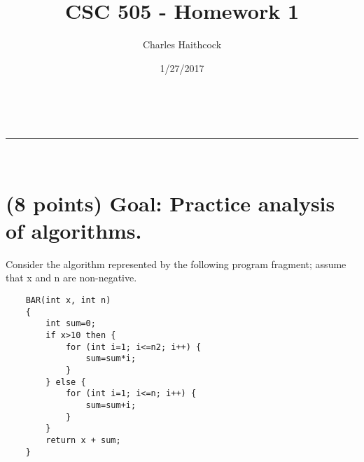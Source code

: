 \documentclass[a4paper,11pt]{article}
\makeatletter
\newcommand{\linia}{\rule{\linewidth}{0.5pt}}
\theoremstyle{mytheor}
\renewcommand{\maketitle}{
\begin{center}
\vspace{2ex}
{\huge \textsc{\@title}}
\vspace{1ex}
\\
\linia\\
\@author \hfill \@date
\vspace{4ex}
\end{center}
}
\makeatother
\begin{document}
\title{CSC 505 - Homework 1}

\author{Charles Haithcock}

\date{1/27/2017}

\maketitle








\section{(8 points) Goal: Practice analysis of algorithms.}

Consider the algorithm represented by the following program fragment; assume 
that x and n are non-negative.

\begin{verbatim}
    BAR(int x, int n)
    {
        int sum=0;
        if x>10 then {
            for (int i=1; i<=n2; i++) {
                sum=sum*i;
            }
        } else {
            for (int i=1; i<=n; i++) {
                sum=sum+i;
            }
        }
        return x + sum;
    }
\end{verbatim}
\end{document}

